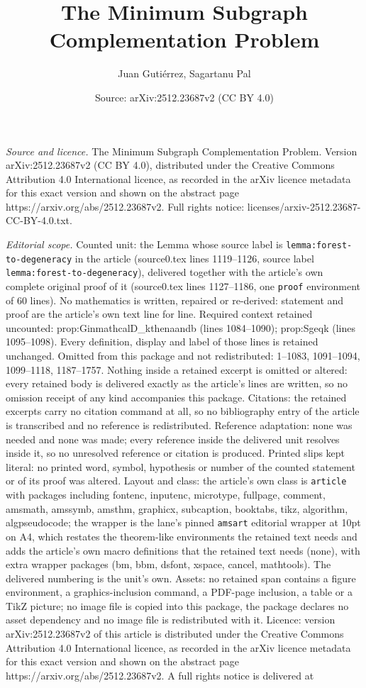 \documentclass[10pt,a4paper]{amsart}
\title[The Minimum Subgraph Complementation Problem]{The Minimum Subgraph Complementation Problem}
\author{Juan Guti\'errez, Sagartanu Pal}
\date{Source: arXiv:2512.23687v2 (CC BY 4.0)}
\begin{document}
\maketitle

\noindent\emph{Source and licence.} The Minimum Subgraph Complementation Problem. Version arXiv:2512.23687v2 (CC BY 4.0), distributed under the Creative Commons Attribution 4.0 International licence, as recorded in the arXiv licence metadata for this exact version and shown on the abstract page https://arxiv.org/abs/2512.23687v2. Full rights notice: licenses/arxiv-2512.23687-CC-BY-4.0.txt.\par\smallskip

\noindent\textit{Editorial scope.} Counted unit: the Lemma whose source label is \texttt{lemma:forest-to-degeneracy} in the article (source0.tex lines 1119--1126, source label \texttt{lemma:forest-to-degeneracy}), delivered together with the article's own complete original proof of it (source0.tex lines 1127--1186, one \texttt{proof} environment of 60 lines). No mathematics is written, repaired or re-derived: statement and proof are the article's own text line for line. Required context retained uncounted: prop:GinmathcalD\_kthenaandb (lines 1084--1090); prop:Sgeqk (lines 1095--1098). Every definition, display and label of those lines is retained unchanged. Omitted from this package and not redistributed: 1--1083, 1091--1094, 1099--1118, 1187--1757. Nothing inside a retained excerpt is omitted or altered: every retained body is delivered exactly as the article's lines are written, so no omission receipt of any kind accompanies this package. Citations: the retained excerpts carry no citation command at all, so no bibliography entry of the article is transcribed and no reference is redistributed. Reference adaptation: none was needed and none was made; every reference inside the delivered unit resolves inside it, so no unresolved reference or citation is produced. Printed slips kept literal: no printed word, symbol, hypothesis or number of the counted statement or of its proof was altered. Layout and class: the article's own class is \texttt{article} with packages including fontenc, inputenc, microtype, fullpage, comment, amsmath, amssymb, amsthm, graphicx, subcaption, booktabs, tikz, algorithm, algpseudocode; the wrapper is the lane's pinned \texttt{amsart} editorial wrapper at 10pt on A4, which restates the theorem-like environments the retained text needs and adds the article's own macro definitions that the retained text needs (none), with extra wrapper packages (bm, bbm, dsfont, xspace, cancel, mathtools). The delivered numbering is the unit's own. Assets: no retained span contains a figure environment, a graphics-inclusion command, a PDF-page inclusion, a table or a TikZ picture; no image file is copied into this package, the package declares no asset dependency and no image file is redistributed with it. Licence: version arXiv:2512.23687v2 of this article is distributed under the Creative Commons Attribution 4.0 International licence, as recorded in the arXiv licence metadata for this exact version and shown on the abstract page https://arxiv.org/abs/2512.23687v2. A full rights notice is delivered at 
\end{document}
